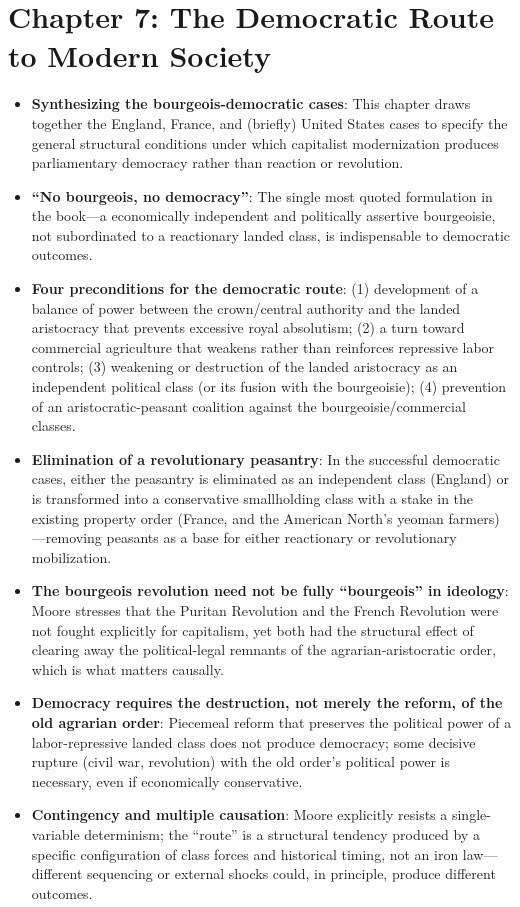 \documentclass[12pt]{article}
\begin{document}
\section{Chapter 7: The Democratic Route to Modern Society}

\begin{itemize}[leftmargin=*, itemsep=4pt]
    \item \textbf{Synthesizing the bourgeois-democratic cases}: This chapter draws together the England, France, and (briefly) United States cases to specify the general structural conditions under which capitalist modernization produces parliamentary democracy rather than reaction or revolution.
    \item \textbf{``No bourgeois, no democracy''}: The single most quoted formulation in the book---a economically independent and politically assertive bourgeoisie, not subordinated to a reactionary landed class, is indispensable to democratic outcomes.
    \item \textbf{Four preconditions for the democratic route}: (1) development of a balance of power between the crown/central authority and the landed aristocracy that prevents excessive royal absolutism; (2) a turn toward commercial agriculture that weakens rather than reinforces repressive labor controls; (3) weakening or destruction of the landed aristocracy as an independent political class (or its fusion with the bourgeoisie); (4) prevention of an aristocratic-peasant coalition against the bourgeoisie/commercial classes.
    \item \textbf{Elimination of a revolutionary peasantry}: In the successful democratic cases, either the peasantry is eliminated as an independent class (England) or is transformed into a conservative smallholding class with a stake in the existing property order (France, and the American North's yeoman farmers)---removing peasants as a base for either reactionary or revolutionary mobilization.
    \item \textbf{The bourgeois revolution need not be fully ``bourgeois'' in ideology}: Moore stresses that the Puritan Revolution and the French Revolution were not fought explicitly for capitalism, yet both had the structural effect of clearing away the political-legal remnants of the agrarian-aristocratic order, which is what matters causally.
    \item \textbf{Democracy requires the destruction, not merely the reform, of the old agrarian order}: Piecemeal reform that preserves the political power of a labor-repressive landed class does not produce democracy; some decisive rupture (civil war, revolution) with the old order's political power is necessary, even if economically conservative.
    \item \textbf{Contingency and multiple causation}: Moore explicitly resists a single-variable determinism; the ``route'' is a structural tendency produced by a specific configuration of class forces and historical timing, not an iron law---different sequencing or external shocks could, in principle, produce different outcomes.
\end{itemize}
\end{document}
